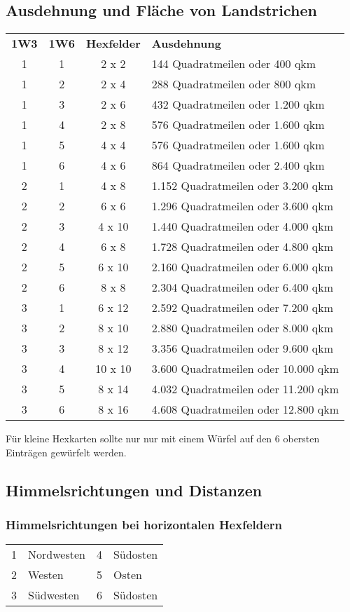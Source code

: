 \documentclass[11pt]{wbzine}
\begin{document}
\subsection{Ausdehnung und Fläche von Landstrichen}
\begin{tabularx}{\columnwidth}{cccZ}
\textbf{1W3} & \textbf{1W6} & \textbf{Hexfelder} &
\textbf{Ausdehnung} \\
1 & 1 & 2 x 2 & 144 Quadratmeilen oder 400 qkm\\
1 & 2 & 2 x 4 & 288 Quadratmeilen oder 800 qkm\\
1 & 3 & 2 x 6 & 432 Quadratmeilen oder 1.200 qkm\\
1 & 4 & 2 x 8 & 576 Quadratmeilen oder 1.600 qkm\\
1 & 5 & 4 x 4 & 576 Quadratmeilen oder 1.600 qkm\\
1 & 6 & 4 x 6 & 864 Quadratmeilen oder 2.400 qkm\\
2 & 1 & 4 x 8 & 1.152 Quadratmeilen oder 3.200 qkm\\
2 & 2 & 6 x 6 & 1.296 Quadratmeilen oder 3.600 qkm\\
2 & 3 & 4 x 10 & 1.440 Quadratmeilen oder 4.000 qkm\\
2 & 4 & 6 x 8 & 1.728 Quadratmeilen oder 4.800 qkm\\
2 & 5 & 6 x 10 & 2.160 Quadratmeilen oder 6.000 qkm\\
2 & 6 & 8 x 8 & 2.304 Quadratmeilen oder 6.400 qkm\\
3 & 1 & 6 x 12 & 2.592 Quadratmeilen oder 7.200 qkm\\
3 & 2 & 8 x 10 & 2.880 Quadratmeilen oder 8.000 qkm\\
3 & 3 & 8 x 12 & 3.356 Quadratmeilen oder 9.600 qkm\\
3 & 4 & 10 x 10 & 3.600 Quadratmeilen oder 10.000 qkm\\
3 & 5 & 8 x 14 & 4.032 Quadratmeilen oder 11.200 qkm\\
3 & 6 & 8 x 16 & 4.608 Quadratmeilen oder 12.800 qkm\\
\end{tabularx}

Für kleine Hexkarten sollte nur nur mit einem Würfel 
auf den 6 obersten Einträgen gewürfelt werden.

\subsection{Himmelsrichtungen und
Distanzen}\label{himmelsrichtungen-und-distanzen}

\subsubsection{Himmelsrichtungen bei horizontalen Hexfeldern}
\begin{tabularx}{\columnwidth}{cZcZ}
1 & Nordwesten & 4 & Südosten\\
2 & Westen & 5 & Osten\\
3 & Südwesten & 6 & Südosten\\
\end{tabularx}
\end{document}
